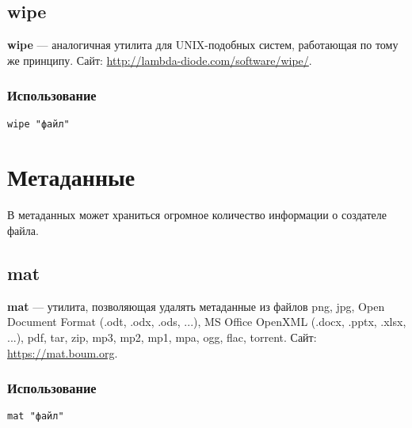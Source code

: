 \subsection{wipe}
\textbf{wipe} --- аналогичная утилита для UNIX-подобных систем, работающая по тому же принципу. Сайт: \url{http://lambda-diode.com/software/wipe/}.
\subsubsection{Использование}
\begin{lstlisting}
wipe "файл"
\end{lstlisting}
\section{Метаданные}
\begin{important}
В метаданных может храниться огромное количество информации о создателе файла.
\end{important}
\subsection{mat}
\textbf{mat} --- утилита, позволяющая удалять метаданные из файлов png, jpg, Open Document Format (.odt, .odx, .ods, ...), MS Office OpenXML (.docx, .pptx, .xlsx, ...), pdf, tar, zip, mp3, mp2, mp1, mpa, ogg, flac, torrent. Сайт: \url{https://mat.boum.org}.
\subsubsection{Использование}
\begin{lstlisting}
mat "файл"
\end{lstlisting}
